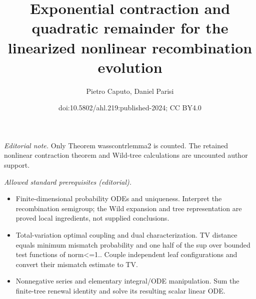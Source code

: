 \documentclass[10pt,a4paper]{article}
\title{Exponential contraction and quadratic remainder for the linearized nonlinear recombination evolution}
\author{Pietro Caputo, Daniel Parisi}
\date{doi:10.5802/ahl.219:published-2024; CC BY4.0}
\begin{document}
\maketitle
\noindent\textit{Editorial note.} Only Theorem wasscontrlemma2 is counted. The retained nonlinear contraction theorem and Wild-tree calculations are uncounted author support.\par\medskip
\noindent\textit{Allowed standard prerequisites (editorial).}\begin{itemize}
\item Finite-dimensional probability ODEs and uniqueness. Interpret the recombination semigroup; the Wild expansion and tree representation are proved local ingredients, not supplied conclusions.
\item Total-variation optimal coupling and dual characterization. TV distance equals minimum mismatch probability and one half of the sup over bounded test functions of norm<=1.. Couple independent leaf configurations and convert their mismatch estimate to TV.
\item Nonnegative series and elementary integral/ODE manipulation. Sum the finite-tree renewal identity and solve its resulting scalar linear ODE.
\end{itemize}\medskip
\end{document}
